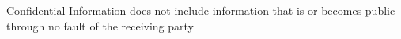 Confidential Information does not include information that is or becomes
public through no fault of the receiving party
